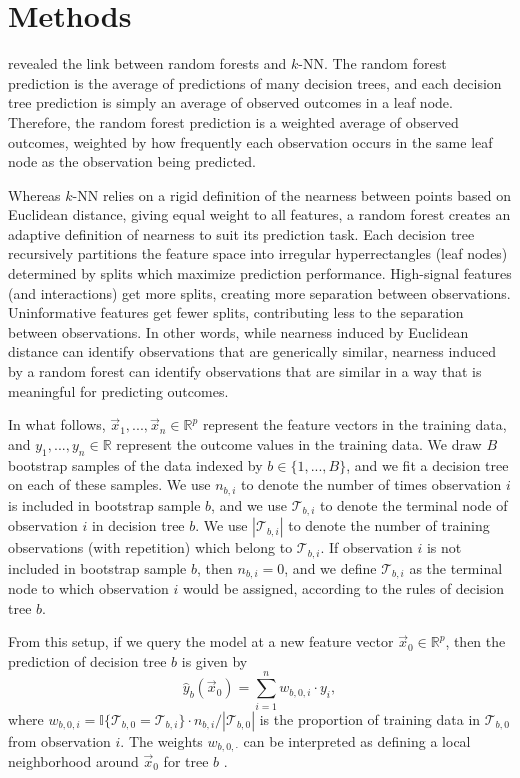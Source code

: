 \documentclass[Review, sageh, times, doublespace]{sagej}
\begin{document}
\section{Methods}
\label{sec:methods}

  \citet{lin_random_2006} revealed the link between random forests and $k$-NN. The random forest prediction is the average of predictions of many decision trees, and each decision tree prediction is simply an average of observed outcomes in a leaf node. Therefore, the random forest prediction is a weighted average of observed outcomes, weighted by how frequently each observation occurs in the same leaf node as the observation being predicted.

  Whereas $k$-NN relies on a rigid definition of the nearness between points based on Euclidean distance, giving equal weight to all features, a random forest creates an adaptive definition of nearness to suit its prediction task. Each decision tree recursively partitions the feature space into irregular hyperrectangles (leaf nodes) determined by splits which maximize prediction performance. High-signal features (and interactions) get more splits, creating more separation between observations. Uninformative features get fewer splits, contributing less to the separation between observations. In other words, while nearness induced by Euclidean distance can identify observations that are generically similar, nearness induced by a random forest can identify observations that are similar in a way that is meaningful for predicting outcomes.

In what follows, $\vec x_1, ..., \vec x_n \in \mathbb{R}^p$ represent the feature vectors in the training data, and $y_1, ..., y_n \in \mathbb{R}$ represent the outcome values in the training data. We draw $B$ bootstrap samples of the data indexed by $b \in \{1, ..., B\}$, and we fit a decision tree on each of these samples. We use $n_{b,i}$ to denote the number of times observation $i$ is included in bootstrap sample $b$, and we use $\mathcal{T}_{b,i}$ to denote the terminal node of observation $i$ in decision tree $b$. We use $|\mathcal{T}_{b,i}|$ to denote the number of training observations (with repetition) which belong to $\mathcal{T}_{b,i}$. If observation $i$ is not included in bootstrap sample $b$, then $n_{b,i} = 0$, and we define $\mathcal{T}_{b,i}$ as the terminal node to which observation $i$ would be assigned, according to the rules of decision tree $b$.

From this setup, if we query the model at a new feature vector $\vec x_0 \in \mathbb{R}^p$, then the prediction of decision tree $b$ is given by
$$
  \hat{y}_b(\vec x_0) = \sum_{i = 1}^{n} w_{b,0,i} \cdot y_i,
$$
where $w_{b,0,i} = \mathbb{I}\{\mathcal{T}_{b,0} = \mathcal{T}_{b,i}\} \cdot n_{b,i} / |\mathcal{T}_{b,0}|$ is the proportion of training data in $\mathcal{T}_{b,0}$ from observation $i$. The weights $w_{b,0,\cdot}$ can be interpreted as defining a local neighborhood around $\vec x_0$ for tree $b$ \citep{lin_random_2006}.
\end{document}
